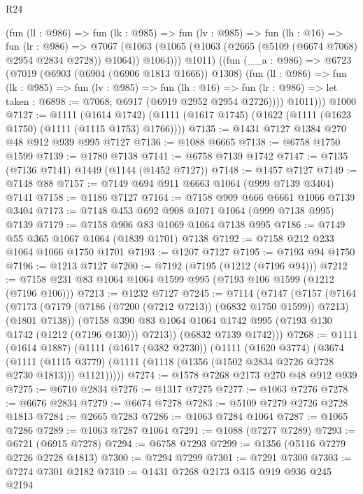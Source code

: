 \begin{lexlean}{R24}
\begin{coremodule}
          (fun (ll : @986) =>
          fun (lk : @985) =>
          fun (lv : @985) =>
          fun (lh : @16) =>
          fun (lr : @986) =>
          @7067
            (@1063 (@1065 (@1063 (@2665 (@5109 (@6674 @7068) @2954 @2834 @2728)) @1064)) @1064)))
          @1011)
        ((fun (__a : @986) =>
        @6723
          (@7019
            (@6903 (@6904 (@6906 @1813 @1666)) @1308)
            (fun (ll : @986) =>
            fun (lk : @985) =>
            fun (lv : @985) =>
            fun (lh : @16) =>
            fun (lr : @986) => let taken : @6898 := @7068; @6917 (@6919 @2952 @2954 @2726))))
          @1011)))
    @1000
@7127 := @1111
    (@1614 @1742)
    (@1111 (@1617 @1745) (@1622 (@1111 (@1623 @1750) (@1111 (@1115 @1753) @1766))))
@7135 := @1431 @7127 @1384 @270 @48 @912 @939 @995 @7127
@7136 := @1088 @6665
@7138 := @6758 @1750 @1599
@7139 := @1780 @7138
@7141 := @6758 @7139 @1742
@7147 := @7135 (@7136 @7141) @1449 (@1144 (@1452 @7127))
@7148 := @1457 @7127
@7149 := @7148 @88
@7157 := @7149 @694 @911 @6663 @1064 (@999 @7139 @3404) @7141
@7158 := @1186 @7127
@7164 := @7158 @909 @666 @6661 @1066 @7139 @3404
@7173 := @7148 @453 @692 @908 @1071 @1064 (@999 @7138 @995) @7139
@7179 := @7158 @906 @83 @1069 @1064 @7138 @995
@7186 := @7149 @55 @365 @1067 @1064 (@1839 @1701) @7138
@7192 := @7158 @212 @233 @1064 @1066 @1750 @1701
@7193 := @1207 @7127
@7195 := @7193 @94 @1750
@7196 := @1213 @7127
@7200 := @7192 (@7195 (@1212 (@7196 @94)))
@7212 := @7158 @231 @83 @1064 @1064 @1599 @995 (@7193 @106 @1599 (@1212 (@7196 @106)))
@7213 := @1232 @7127
@7245 := @7114
    (@7147
      (@7157
        (@7164
          (@7173 (@7179 (@7186 (@7200 (@7212 @7213)) (@6832 @1750 @1599)) @7213) (@1801 @7138))
          (@7158 @390 @83 @1064 @1064 @1742 @995 (@7193 @130 @1742 (@1212 (@7196 @130))) @7213))
        (@6832 @7139 @1742)))
@7268 := @1111
    (@1614 @1887)
    (@1111
      (@1617 (@382 @2730))
      (@1111
        (@1620 @3774)
        (@3674
          (@1111
            (@1115 @3779)
            (@1111 (@1118 (@1356 (@1502 @2834 @2726 @2728 @2730 @1813))) @1121)))))
@7274 := @1578 @7268 @2173 @270 @48 @912 @939
@7275 := @6710 @2834
@7276 := @1317 @7275
@7277 := @1063 @7276
@7278 := @6676 @2834
@7279 := @6674 @7278
@7283 := @5109 @7279 @2726 @2728 @1813
@7284 := @2665 @7283
@7286 := @1063 @7284 @1064
@7287 := @1065 @7286
@7289 := @1063 @7287 @1064
@7291 := @1088 (@7277 @7289)
@7293 := @6721 (@6915 @7278)
@7294 := @6758 @7293
@7299 := @1356 (@5116 @7279 @2726 @2728 @1813)
@7300 := @7294 @7299
@7301 := @7291 @7300
@7303 := @7274 @7301 @2182
@7310 := @1431 @7268 @2173 @315 @919 @936 @245 @2194

\end{coremodule}
\end{lexlean}
